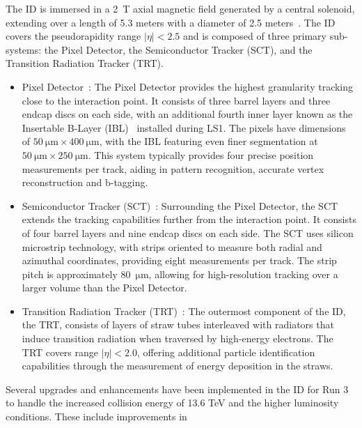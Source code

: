         The ID is immersed in a 2~T axial magnetic field generated by a central solenoid, 
        extending over a length of 5.3 meters with a diameter of 2.5 meters~\cite{ATLAS-TDR-06}. The ID covers the 
        pseudorapidity range $|\eta| < 2.5$ and is composed of three primary sub-systems: 
        the Pixel Detector, 
        the Semiconductor Tracker (SCT), 
        and the Transition Radiation Tracker (TRT).
        \begin{itemize}
            \item Pixel Detector~\cite{ATLAS-TDR-11}: The Pixel Detector provides the highest granularity tracking close to the 
            interaction point. It consists of three barrel layers and three endcap discs on each side, with an 
            additional fourth inner layer known as the Insertable B-Layer (IBL)~\cite{PIX-2018-001} installed during LS1. 
            The pixels have dimensions of $50~\si{\um} \times 400~\si{\um}$, 
            with the IBL featuring even finer segmentation at $50~\si{\um} \times 250~\si{\um}$. 
            This system typically provides four precise position 
            measurements per track, aiding in pattern recognition, accurate vertex reconstruction and b-tagging.
            \item Semiconductor Tracker (SCT)~\cite{SCTD-2019-01}: Surrounding the Pixel Detector, the SCT extends the tracking 
            capabilities further from the interaction point. It consists of four barrel layers and nine endcap 
            discs on each side. The SCT uses silicon microstrip technology, with strips oriented to measure both 
            radial and azimuthal coordinates, providing eight measurements per track. The strip pitch is approximately 
            80~$\si{\um}$, allowing for high-resolution tracking over a larger volume than the Pixel Detector.
            \item Transition Radiation Tracker (TRT)~\cite{IDET-2015-01}: The outermost component of the ID, the TRT,
            consists of layers of straw tubes interleaved with radiators that induce transition radiation 
            when traversed by high-energy electrons. The TRT covers range $|\eta| < 2.0$, offering additional particle identification 
            capabilities through the measurement of energy deposition in the straws.
        \end{itemize}
        Several upgrades and enhancements have been implemented in the ID for Run 3 to handle the increased 
        collision energy of 13.6 TeV and the higher luminosity conditions. These include improvements in 
